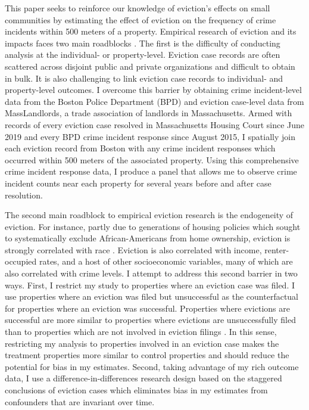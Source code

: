 \documentclass[12pt]{article}
\begin{document}
This paper seeks to reinforce our knowledge of eviction's effects on small communities by estimating the effect of eviction on the frequency of crime incidents within 500 meters of a property. Empirical research of eviction and its impacts faces two main roadblocks \citep{collinson_eviction_2022}. The first is the difficulty of conducting analysis at the individual- or property-level. Eviction case records are often scattered across disjoint public and private organizations and difficult to obtain in bulk. It is also challenging to link eviction case records to individual- and property-level outcomes. I overcome this barrier by obtaining crime incident-level data from the Boston Police Department (BPD) and eviction case-level data from MassLandlords, a trade association of landlords in Massachusetts. Armed with records of every eviction case resolved in Massachusetts Housing Court since June 2019 and every BPD crime incident response since August 2015, I spatially join each eviction record from Boston with any crime incident responses which occurred within 500 meters of the associated property. Using this comprehensive crime incident response data, I produce a panel that allows me to observe crime incident counts near each property for several years before and after case resolution. 


The second main roadblock to empirical eviction research is the endogeneity of eviction. For instance, partly due to generations of housing policies which sought to systematically exclude African-Americans from home ownership, eviction is strongly correlated with race \citep{rothstein_color_2017}. Eviction is also correlated with income, renter-occupied rates, and a host of other socioeconomic variables, many of which are also correlated with crime levels. I attempt to address this second barrier in two ways. First, I restrict my study to properties where an eviction case was filed. I use properties where an eviction was filed but unsuccessful as the counterfactual for properties where an eviction was successful. Properties where evictions are successful are more similar to properties where evictions are unsuccessfully filed than to properties which are not involved in eviction filings \citep{robinson_eviction_2021}. In this sense, restricting my analysis to properties involved in an eviction case makes the treatment properties more similar to control properties and should reduce the potential for bias in my estimates. Second, taking advantage of my rich outcome data, I use a difference-in-differences research design based on the staggered conclusions of eviction cases which eliminates bias in my estimates from confounders that are invariant over time. 
\end{document}
